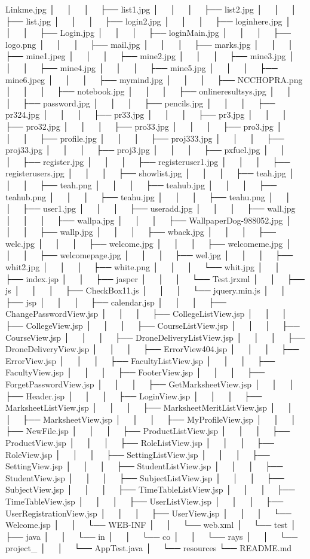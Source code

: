 Linkme.\+jpg │   │   │   ├── list1.\+jpg │   │   │   ├── list2.\+jpg │   │   │   ├── list.\+jpg │   │   │   ├── login2.\+jpg │   │   │   ├── loginhere.\+jpg │   │   │   ├── Login.\+jpg │   │   │   ├── login\+Main.\+jpg │   │   │   ├── logo.\+png │   │   │   ├── mail.\+jpg │   │   │   ├── marks.\+jpg │   │   │   ├── mine1.\+jpeg │   │   │   ├── mine2.\+jpg │   │   │   ├── mine3.\+jpg │   │   │   ├── mine4.\+jpg │   │   │   ├── mine5.\+jpg │   │   │   ├── mine6.\+jpeg │   │   │   ├── mymind.\+jpg │   │   │   ├── NCCHOPRA.\+png │   │   │   ├── notebook.\+jpg │   │   │   ├── onlineresultsys.\+jpg │   │   │   ├── password.\+jpg │   │   │   ├── pencils.\+jpg │   │   │   ├── pr324.\+jpg │   │   │   ├── pr33.\+jpg │   │   │   ├── pr3.\+jpg │   │   │   ├── pro32.\+jpg │   │   │   ├── pro33.\+jpg │   │   │   ├── pro3.\+jpg │   │   │   ├── profile.\+jpg │   │   │   ├── proj333.\+jpg │   │   │   ├── proj33.\+jpg │   │   │   ├── proj3.\+jpg │   │   │   ├── pxfuel.\+jpg │   │   │   ├── register.\+jpg │   │   │   ├── registeruser1.\+jpg │   │   │   ├── registerusers.\+jpg │   │   │   ├── showlist.\+jpg │   │   │   ├── teah.\+jpg │   │   │   ├── teah.\+png │   │   │   ├── teahub.\+jpg │   │   │   ├── teahub.\+png │   │   │   ├── teahu.\+jpg │   │   │   ├── teahu.\+png │   │   │   ├── user1.\+jpg │   │   │   ├── useradd.\+jpg │   │   │   ├── wall.\+jpg │   │   │   ├── wallpa.\+jpg │   │   │   ├── Wallpaper\+Dog-\/988052.\+jpg │   │   │   ├── wallp.\+jpg │   │   │   ├── wback.\+jpg │   │   │   ├── welc.\+jpg │   │   │   ├── welcome.\+jpg │   │   │   ├── welcomeme.\+jpg │   │   │   ├── welcomepage.\+jpg │   │   │   ├── wel.\+jpg │   │   │   ├── whit2.\+jpg │   │   │   ├── white.\+png │   │   │   └── whit.\+jpg │   │   ├── index.\+jsp │   │   ├── jasper │   │   │   └── Test.\+jrxml │   │   ├── js │   │   │   ├── Check\+Box11.\+js │   │   │   └── jquery.\+min.\+js │   │   ├── jsp │   │   │   ├── calendar.\+jsp │   │   │   ├── Change\+Password\+View.\+jsp │   │   │   ├── College\+List\+View.\+jsp │   │   │   ├── College\+View.\+jsp │   │   │   ├── Course\+List\+View.\+jsp │   │   │   ├── Course\+View.\+jsp │   │   │   ├── Drone\+Delivery\+List\+View.\+jsp │   │   │   ├── Drone\+Delivery\+View.\+jsp │   │   │   ├── Error\+View404.\+jsp │   │   │   ├── Error\+View.\+jsp │   │   │   ├── Faculty\+List\+View.\+jsp │   │   │   ├── Faculty\+View.\+jsp │   │   │   ├── Footer\+View.\+jsp │   │   │   ├── Forget\+Password\+View.\+jsp │   │   │   ├── Get\+Marksheet\+View.\+jsp │   │   │   ├── Header.\+jsp │   │   │   ├── Login\+View.\+jsp │   │   │   ├── Marksheet\+List\+View.\+jsp │   │   │   ├── Marksheet\+Merit\+List\+View.\+jsp │   │   │   ├── Marksheet\+View.\+jsp │   │   │   ├── My\+Profile\+View.\+jsp │   │   │   ├── New\+File.\+jsp │   │   │   ├── Product\+List\+View.\+jsp │   │   │   ├── Product\+View.\+jsp │   │   │   ├── Role\+List\+View.\+jsp │   │   │   ├── Role\+View.\+jsp │   │   │   ├── Setting\+List\+View.\+jsp │   │   │   ├── Setting\+View.\+jsp │   │   │   ├── Student\+List\+View.\+jsp │   │   │   ├── Student\+View.\+jsp │   │   │   ├── Subject\+List\+View.\+jsp │   │   │   ├── Subject\+View.\+jsp │   │   │   ├── Time\+Table\+List\+View.\+jsp │   │   │   ├── Time\+Table\+View.\+jsp │   │   │   ├── User\+List\+View.\+jsp │   │   │   ├── User\+Registration\+View.\+jsp │   │   │   ├── User\+View.\+jsp │   │   │   └── Welcome.\+jsp │   │   └── WEB-\/\+INF │   │   └── web.\+xml │   └── test │   ├── java │   │   └── in │   │   └── co │   │   └── rays │   │   └── project\+\_ │   │   └── App\+Test.\+java │   └── resources └── README.\+md 